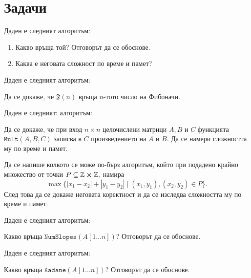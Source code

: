 \section{Задачи}

\begin{problem}
Даден е следният алгоритъм:


\begin{enumerate}
    \item Какво връща той? Отговорът да се обоснове.
    \item Каква е неговата сложност по време и памет?
\end{enumerate}
\end{problem}

\newpage

\begin{problem}
Даден е следният алгоритъм:


Да се докаже, че $\mathfrak{F}(n)$ връща $n$-тото число на Фибоначи.
\end{problem}

\begin{problem}
Даден е следният: алгоритъм:


Да се докаже, че при вход $n \times n$ целочислени матрици $A, B$ и $C$ функцията $\mathtt{Mult}(A, B, C)$ записва в $C$ произведението на $A$ и $B$.
Да се намери сложността му по време и памет.
\end{problem}

\begin{problem}
Да се напише колкото се може по-бърз алгоритъм, който при подадено крайно множество от точки $P \subseteq \mathbb{Z} \cross \mathbb{Z}$, намира
\[
    \max \{ |x_1 - x_2| + |y_1 - y_2| \mid (x_1, y_1), (x_2, y_2) \in P \}.
\]
След това да се докаже неговата коректност и да се изследва сложността му по време и памет.
\end{problem}

\begin{problem}
Даден е следният алгоритъм:


Какво връща $\mathtt{NumSlopes}(A[1 \dots n])$?
Отговорът да се обоснове.
\end{problem}

\begin{problem}
Даден е следният алгоритъм:


Какво връща $\mathtt{Kadane}(A[1 \dots n])$?
Отговорът да се обоснове.
\end{problem}

